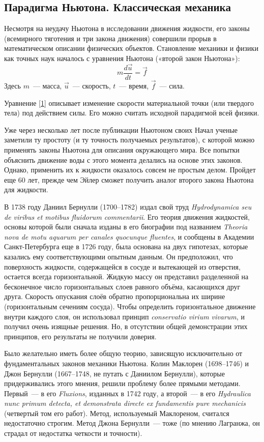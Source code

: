 \subsection{Парадигма Ньютона. Классическая механика}

Несмотря на неудачу Ньютона в исследовании движения жидкости, его законы (всемирного тяготения и три закона движения) совершили прорыв в математическом описании физических объектов. Становление механики и физики как точных наук началось с уравнения Ньютона («второй закон Ньютона»):
$$
	m \frac{d \vec u}{d t} = \vec f
	\label{1}
$$
Здесь $m$~--- масса, $\vec u$~--- скорость, $t$~--- время, $\vec f$~--- сила.

Уравнение \ref{1} описывает изменение скорости материальной точки (или твердого тела) под действием силы. Его можно считать исходной парадигмой всей физики.

Уже через несколько лет после публикации Ньютоном своих Начал ученые заметили ту простоту (и ту точность получаемых результатов), с которой можно применять законы Ньютона для описания окружающего мира. Все попытки объяснить движение воды с этого момента делались на основе этих законов. Однако, применить их к жидкости оказалось совсем не простым делом. Пройдет еще 60 лет, прежде чем Эйлер сможет получить аналог второго закона Ньютона для жидкости.

В 1738 году Даниил Бернулли (1700--1782) издал свой труд \textit{Hydrodynamica seu de viribus et motibus fluidorum
commentarii}. Его теория движения жидкостей, основы которой были сначала изданы в его биографии под названием 
\textit{Theoria nova de motu aquarum per canales quocunque fluentes}, и сообщены в Академии Санкт-Петербурга 
еще в 1726 году, была основана на двух гипотезах, которые казались ему соответствующими опытным данным. 
Он предположил, что поверхность жидкости, содержащейся в сосуде и вытекающей из отверстия, остается всегда
горизонтальной. Жидкую массу он представил разделенной на бесконечное число горизонтальных слоев равного объёма,
касающихся друг друга. Скорость опускания слоёв обратно пропорциональна их ширине (горизонтальным сечениям сосуда).
Чтобы определить горизонтальное движение внутри каждого слоя, он использовал принцип \textit{ conservatio virium
vivarum}, и получил очень изящные решения. Но, в отсутствии общей демонстрации этих принципов, его результаты не
получили доверия.

Было желательно иметь более общую теорию, зависящую исключительно от фундаментальных законов механики Ньютона. Колин Маклорен (1698--1746) и Джон Бернулли (1667--1748, не путать с Даниилом Бернулли), которые придерживались этого мнения, решили проблему более прямыми методами. Первый~--- в его \textit{Fluxions}, изданных в 1742 году, а второй~--- в его \textit{Hydraulica nunc primum detecta, et demonstrata directe ex fundamentis pure mechanicis} (четвертый том его работ). Метод, используемый Маклореном, считался недостаточно строгим. Метод Джона Бернулли~--- тоже (по мнению Лагранжа, он страдал от недостатка четкости и точности).

